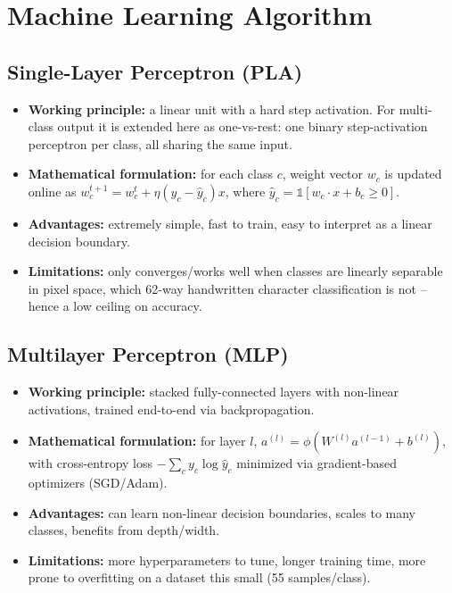 \documentclass[11pt]{article}
\begin{document}
\section{Machine Learning Algorithm}
\label{sec:org85af175}

\subsection{Single-Layer Perceptron (PLA)}
\label{sec:orge1627b7}
\begin{itemize}
\item \textbf{Working principle:} a linear unit with a hard step activation. For multi-class output it
is extended here as one-vs-rest: one binary step-activation perceptron per class, all
sharing the same input.
\item \textbf{Mathematical formulation:} for each class \(c\), weight vector \(w_c\) is updated online as
\(w_c^{t+1} = w_c^{t} + \eta(y_c - \hat{y}_c)x\), where \(\hat{y}_c = \mathbb{1}[w_c \cdot x +
  b_c \geq 0]\).
\item \textbf{Advantages:} extremely simple, fast to train, easy to interpret as a linear decision
boundary.
\item \textbf{Limitations:} only converges/works well when classes are linearly separable in pixel
space, which 62-way handwritten character classification is not -- hence a low ceiling on
accuracy.
\end{itemize}

\subsection{Multilayer Perceptron (MLP)}
\label{sec:org8ed372f}
\begin{itemize}
\item \textbf{Working principle:} stacked fully-connected layers with non-linear activations, trained
end-to-end via backpropagation.
\item \textbf{Mathematical formulation:} for layer \(l\), \(a^{(l)} = \phi(W^{(l)}a^{(l-1)} + b^{(l)})\),
with cross-entropy loss \(-\sum_c y_c \log \hat{y}_c\) minimized via gradient-based
optimizers (SGD/Adam).
\item \textbf{Advantages:} can learn non-linear decision boundaries, scales to many classes, benefits
from depth/width.
\item \textbf{Limitations:} more hyperparameters to tune, longer training time, more prone to
overfitting on a dataset this small (55 samples/class).
\end{itemize}
\end{document}
